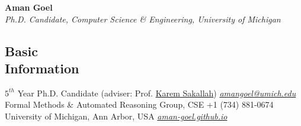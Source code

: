 \documentclass[margin,line,letter]{resume}
\begin{document}
\thispagestyle{empty}
{\sc \LARGE \phantom{xx}\hspace{25ex} \textbf{Aman Goel} 
\vspace{0.3cm}
\\
\large \emph{\phantom{xx}\hspace{11ex} Ph.D. Candidate, Computer Science \& Engineering, University of Michigan}}
\begin{resume}
    

\section{\mysidestyle Basic\\Information}
    $5^{th}$ Year Ph.D. Candidate (adviser: Prof. \href{http://web.eecs.umich.edu/~karem/}{Karem Sakallah})                       \hfill \href{mailto:amangoel@umich.edu}{\textit{amangoel@umich.edu}} \phantom{xx}\hspace{1ex} \faEnvelope \\
    Formal Methods \& Automated Reasoning Group, CSE 
     \hfill +1 (734) 881-0674 \phantom{xx}\hspace{1ex} \faPhone \\
    University of Michigan, Ann Arbor, USA      \hfill \href{https://aman-goel.github.io/}{\textit{aman-goel.github.io}} \phantom{xx}\hspace{1ex} \faExternalLink
    


\end{resume}
\end{document}
